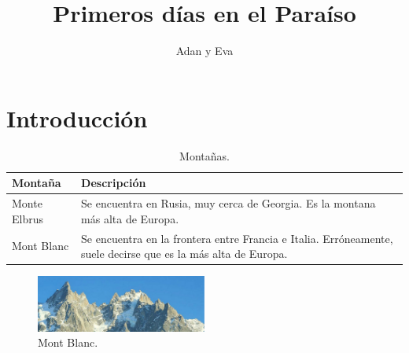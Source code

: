 \documentclass[a4paper,twocolumn,10pt]{article}
\begin{document}
\title{Primeros días en el Paraíso}
\author{Adan y Eva}
\date{}


\section{Introducción}

\begin{table}[htb]
\begin{center}
\begin{tabular}{p{} p{}}
\hline
Montaña & Descripción \\
\hline \hline
Monte Elbrus & Se encuentra en Rusia, muy cerca de Georgia. Es la montana más alta de Europa. \\
\hline
Mont Blanc & Se encuentra en la frontera entre Francia e Italia. Erróneamente, suele decirse que es la más alta de Europa. \\
\hline
\end{tabular}
\caption{Montañas.}
\label{tabla:montanas}
\end{center}
\end{table}

\begin{figure}[htb]
\begin{center}
\includegraphics[width=0.5\textwidth]{./montblanc}
\caption{Mont Blanc.}
\label{fig:mont}
\end{center}
\end{figure}
\end{document}
